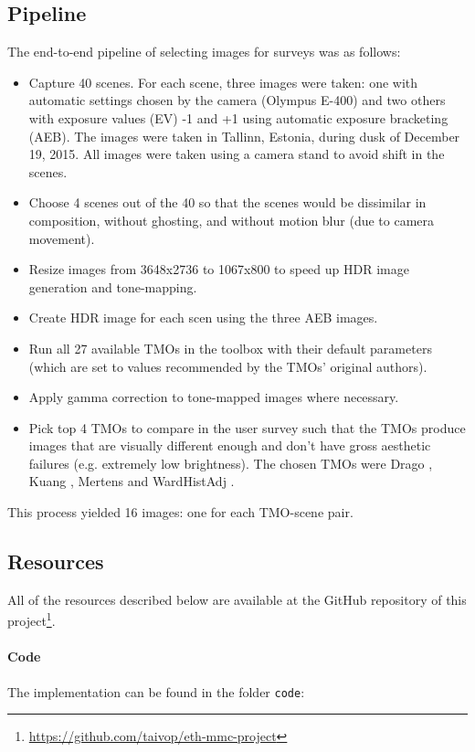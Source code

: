 \documentclass[a4paper]{scrartcl}
\begin{document}
\subsection{Pipeline}

The end-to-end pipeline of selecting images for surveys was as follows:
\begin{itemize}
\item Capture 40 scenes. For each scene, three images were taken: one with automatic settings chosen by the camera (Olympus E-400) and two others with exposure values (EV) -1 and +1 using automatic exposure bracketing (AEB). The images were taken in Tallinn, Estonia, during dusk of December 19, 2015. All images were taken using a camera stand to avoid shift in the scenes.
\item Choose 4 scenes out of the 40 so that the scenes would be dissimilar in composition, without ghosting, and without motion blur (due to camera movement).
\item Resize images from 3648x2736 to 1067x800 to speed up HDR image generation and tone-mapping.
\item Create HDR image for each scen using the three AEB images.
\item Run all 27 available TMOs in the toolbox \cite{Banterle:2011} with their default parameters (which are set to values recommended by the TMOs' original authors).
\item Apply gamma correction to tone-mapped images where necessary.
\item Pick top 4 TMOs to compare in the user survey such that the TMOs produce images that are visually different enough and don't have gross aesthetic failures (e.g. extremely low brightness). The chosen TMOs were Drago \cite{drago2003adaptive}, Kuang \cite{kuang2007icam06}, Mertens \cite{mertens2007exposure} and WardHistAdj \cite{larson1997visibility}.

\end{itemize}

This process yielded 16 images: one for each TMO-scene pair.

\subsection{Resources}

All of the resources described below are available at the GitHub repository of this project\footnote{\url{https://github.com/taivop/eth-mmc-project}}.

\paragraph{Code} The implementation can be found in the folder \texttt{code}: 
\end{document}
